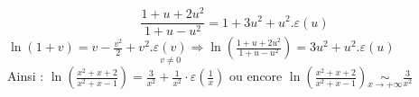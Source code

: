 {\begin{enumerate}
        $$
        \frac{1+u+2 u^{2}}{1+u-u^{2}}=1+3 u^{2}+u^{2} . \varepsilon(u)
        $$
        $\ln (1+v)=v-\frac{v^{2}}{2}+v^{2} . \underset{v \neq 0}{\varepsilon(v)} \Rightarrow \ln \left(\frac{1+u+2 u^{2}}{1+u-u^{2}}\right)=3 u^{2}+u^{2} . \varepsilon(u)$\\
        Ainsi : $\ln \left(\frac{x^{2}+x+2}{x^{2}+x-1}\right)=\frac{3}{x^{2}}+\frac{1}{x^{2}} \cdot \varepsilon\left(\frac{1}{x}\right)$ ou encore $\ln \left(\frac{x^{2}+x+2}{x^{2}+x-1}\right) \underset{x \rightarrow+\infty}{\sim} \frac{3}{x^{2}}$
    \end{enumerate}
}
